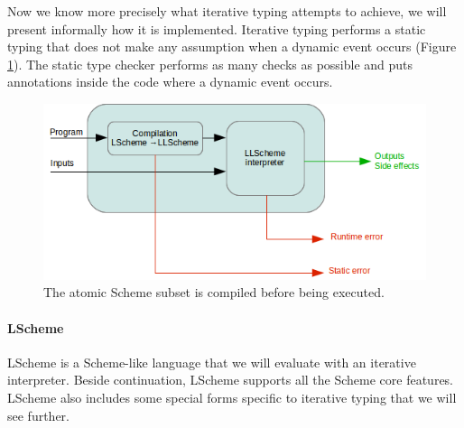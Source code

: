 \documentclass[a4paper]{report}
\newcommand{\reffig}[1]{(Figure \ref{#1})}
\begin{document}
Now we know more precisely what iterative typing attempts to achieve, we will present informally how it is implemented. Iterative typing performs a static typing that does not make any assumption when a dynamic event occurs \reffig{iter_comp_inter}. The static type checker performs as many checks as possible and puts annotations inside the code where a dynamic event occurs.

\begin{figure}
\centering
\includegraphics{images/iter_comp_inter.png}
\caption{The atomic Scheme subset is compiled before being executed.}
\label{iter_comp_inter}
\end{figure}

\paragraph{LScheme} LScheme is a Scheme-like language that we will evaluate with an iterative interpreter. Beside continuation, LScheme supports all the Scheme core features. LScheme also includes some special forms specific to iterative typing that we will see further.
\end{document}
